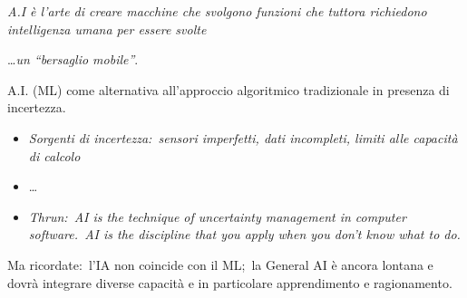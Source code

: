 \begin{center}
	\textit{A.I è l'arte di creare macchine che svolgono funzioni che tuttora richiedono intelligenza umana per essere svolte}

	\dots \textit{un ``bersaglio mobile''}.
\end{center}
A.I. (ML) come alternativa all'approccio algoritmico tradizionale in presenza di incertezza.
\begin{itemize}
	\item \textit{Sorgenti di incertezza:\ sensori imperfetti, dati incompleti, limiti alle capacità di calcolo}
	\item \dots
	\item \textit{Thrun:\ AI is the technique of uncertainty management in computer software.\ AI is the discipline that you apply when you don't know what to do.}
\end{itemize}
Ma ricordate:\ l'IA non coincide con il ML;\ la General AI è ancora lontana e dovrà integrare diverse capacità e in particolare apprendimento e ragionamento.
